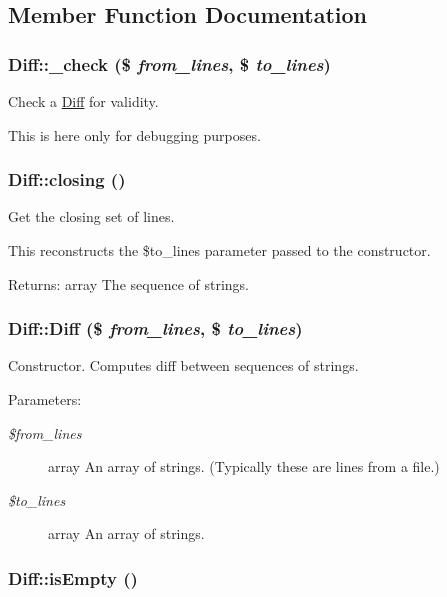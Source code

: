 \subsection{Member Function Documentation}
\hypertarget{classDiff_f7e9122d5f4ccb16a2d6b91b577ccf12}{
\subsubsection[{\_\-check}]{\setlength{\rightskip}{0pt plus 5cm}Diff::\_\-check (\$ {\em from\_\-lines}, \/  \$ {\em to\_\-lines})}}
\label{classDiff_f7e9122d5f4ccb16a2d6b91b577ccf12}


Check a \hyperlink{classDiff}{Diff} for validity.

This is here only for debugging purposes. \hypertarget{classDiff_be492d508c318cdaa2a031297ab046b5}{
\subsubsection[{closing}]{\setlength{\rightskip}{0pt plus 5cm}Diff::closing ()}}
\label{classDiff_be492d508c318cdaa2a031297ab046b5}


Get the closing set of lines.

This reconstructs the \$to\_\-lines parameter passed to the constructor.

\begin{Desc}
\item[Returns:]array The sequence of strings. \end{Desc}
\hypertarget{classDiff_b9e4cd646aac6b13f68d0eeb017a7e42}{
\subsubsection[{Diff}]{\setlength{\rightskip}{0pt plus 5cm}Diff::Diff (\$ {\em from\_\-lines}, \/  \$ {\em to\_\-lines})}}
\label{classDiff_b9e4cd646aac6b13f68d0eeb017a7e42}


Constructor. Computes diff between sequences of strings.

\begin{Desc}
\item[Parameters:]
\begin{description}
\item[{\em \$from\_\-lines}]array An array of strings. (Typically these are lines from a file.) \item[{\em \$to\_\-lines}]array An array of strings. \end{description}
\end{Desc}
\hypertarget{classDiff_a0892a16fe2b987cdddd0a554b48d851}{
\subsubsection[{isEmpty}]{\setlength{\rightskip}{0pt plus 5cm}Diff::isEmpty ()}}
\label{classDiff_a0892a16fe2b987cdddd0a554b48d851}


